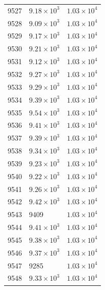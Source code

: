 \begin{table}[H]
\begin{tabular}{lll}
9527 & $\displaystyle 9.18 \times 10^{3}$ & $\displaystyle 1.03 \times 10^{4}$ \\
9528 & $\displaystyle 9.09 \times 10^{3}$ & $\displaystyle 1.03 \times 10^{4}$ \\
9529 & $\displaystyle 9.17 \times 10^{3}$ & $\displaystyle 1.03 \times 10^{4}$ \\
9530 & $\displaystyle 9.21 \times 10^{3}$ & $\displaystyle 1.03 \times 10^{4}$ \\
9531 & $\displaystyle 9.12 \times 10^{3}$ & $\displaystyle 1.03 \times 10^{4}$ \\
9532 & $\displaystyle 9.27 \times 10^{3}$ & $\displaystyle 1.03 \times 10^{4}$ \\
9533 & $\displaystyle 9.29 \times 10^{3}$ & $\displaystyle 1.03 \times 10^{4}$ \\
9534 & $\displaystyle 9.39 \times 10^{3}$ & $\displaystyle 1.03 \times 10^{4}$ \\
9535 & $\displaystyle 9.54 \times 10^{3}$ & $\displaystyle 1.03 \times 10^{4}$ \\
9536 & $\displaystyle 9.41 \times 10^{3}$ & $\displaystyle 1.03 \times 10^{4}$ \\
9537 & $\displaystyle 9.39 \times 10^{3}$ & $\displaystyle 1.03 \times 10^{4}$ \\
9538 & $\displaystyle 9.34 \times 10^{3}$ & $\displaystyle 1.03 \times 10^{4}$ \\
9539 & $\displaystyle 9.23 \times 10^{3}$ & $\displaystyle 1.03 \times 10^{4}$ \\
9540 & $\displaystyle 9.22 \times 10^{3}$ & $\displaystyle 1.03 \times 10^{4}$ \\
9541 & $\displaystyle 9.26 \times 10^{3}$ & $\displaystyle 1.03 \times 10^{4}$ \\
9542 & $\displaystyle 9.42 \times 10^{3}$ & $\displaystyle 1.03 \times 10^{4}$ \\
9543 & 9409 & $\displaystyle 1.03 \times 10^{4}$ \\
9544 & $\displaystyle 9.41 \times 10^{3}$ & $\displaystyle 1.03 \times 10^{4}$ \\
9545 & $\displaystyle 9.38 \times 10^{3}$ & $\displaystyle 1.03 \times 10^{4}$ \\
9546 & $\displaystyle 9.37 \times 10^{3}$ & $\displaystyle 1.03 \times 10^{4}$ \\
9547 & 9285 & $\displaystyle 1.03 \times 10^{4}$ \\
9548 & $\displaystyle 9.33 \times 10^{3}$ & $\displaystyle 1.03 \times 10^{4}$ \\

\end{tabular}
\end{table}
